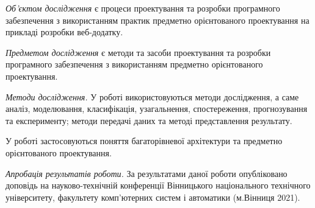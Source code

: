 \emph{Об'єктом дослідження} є процеси проектування та розробки
програмного забезпечення з використанням практик 
предметно орієнтованого проектування на прикладі розробки веб-додатку.

\emph{Предметом дослідження} є методи та засоби проектування та
розробки програмного забезпечення з використанням предметно орієнтованого проектування.

\emph{Методи дослідження.} У роботі використовуються методи дослідження, а
саме аналіз, моделювання, класифікація, узагальнення, спостереження,
прогнозування та експерименту; методи передачі даних та методі
представлення результату.

У роботі застосовуються поняття багаторівневої архітектури та
предметно орієнтованого проектування.

\emph{Апробація результатів роботи.} За результатами даної роботи
опубліковано доповідь \cite{thesis} на науково-технічній конференції
Вінницького національного технічного університету,
факультету комп'ютерних систем і автоматики (м.Вінниця 2021).
